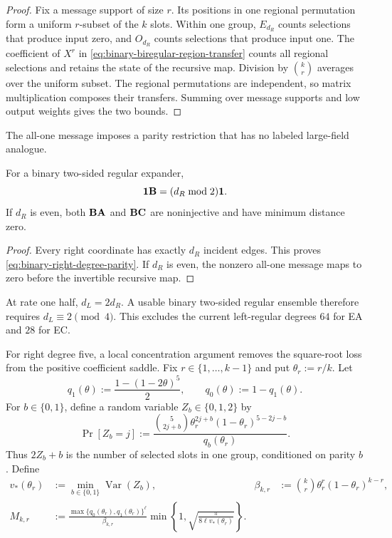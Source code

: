 \begin{proof}
Fix a message support of size $r$.  Its positions in one regional
permutation form a uniform $r$-subset of the $k$ slots.  Within one group,
$E_{d_R}$ counts selections that produce input zero, and $O_{d_R}$ counts
selections that produce input one.  The coefficient of $X^r$ in
\eqref{eq:binary-biregular-region-transfer} counts all regional selections
and retains the state of the recursive map.  Division by $\binom{k}{r}$
averages over the uniform subset.  The regional permutations are independent,
so matrix multiplication composes their transfers.  Summing over message
supports and low output weights gives the two bounds.
\end{proof}

The all-one message imposes a parity restriction that has no labeled
large-field analogue.

\begin{proposition}
\label{prop:binary-right-degree-parity}
For a binary two-sided regular expander,
\begin{equation}
 \mathbf 1\mathbf B=(d_R\bmod 2)\mathbf 1.
 \label{eq:binary-right-degree-parity}
\end{equation}
If $d_R$ is even, both $\mathbf B\mathbf A$ and $\mathbf B\mathbf C$ are noninjective and have minimum
distance zero.
\end{proposition}

\begin{proof}
Every right coordinate has exactly $d_R$ incident edges.  This proves
\eqref{eq:binary-right-degree-parity}.  If $d_R$ is even, the nonzero
all-one message maps to zero before the invertible recursive map.
\end{proof}

At rate one half, $d_L=2d_R$.  A usable binary two-sided regular ensemble
therefore requires $d_L\equiv2\pmod4$.  This excludes the current left-regular
degrees $64$ for EA and $28$ for EC.

For right degree five, a local concentration argument removes the
square-root loss from the positive coefficient saddle.  Fix
$r\in\{1,\ldots,k-1\}$ and put $\theta_r:=r/k$.  Let
\begin{equation}
 q_1(\theta):=\frac{1-(1-2\theta)^5}{2},
 \qquad q_0(\theta):=1-q_1(\theta).
 \label{eq:degree-five-parity-probabilities}
\end{equation}
For $b\in\{0,1\}$, define a random variable $Z_b\in\{0,1,2\}$ by
\begin{equation}
 \Pr[Z_b=j]:=
 \frac{\binom{5}{2j+b}\theta_r^{2j+b}(1-\theta_r)^{5-2j-b}}
 {q_b(\theta_r)}.
 \label{eq:degree-five-conditioned-half-count}
\end{equation}
Thus $2Z_b+b$ is the number of selected slots in one group, conditioned on
parity $b$.  Define
\begin{align}
 v_*(\theta_r)&:=\min_{b\in\{0,1\}}\operatorname{Var}(Z_b),
&
 \beta_{k,r}&:=\binom{k}{r}\theta_r^r(1-\theta_r)^{k-r},
 \label{eq:degree-five-local-parameters}\\
 M_{k,r}&:=
 \frac{\max\{q_0(\theta_r),q_1(\theta_r)\}^{\ell}}{\beta_{k,r}}
 \min\left\{1,\sqrt{\frac{\pi}{8\ell v_*(\theta_r)}}\right\}.
 \label{eq:degree-five-point-mass}
\end{align}

